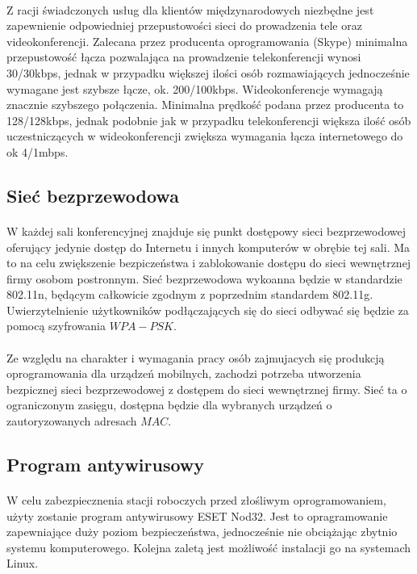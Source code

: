 \paragraph{}
Z racji świadczonych usług dla klientów międzynarodowych niezbędne jest zapewnienie odpowiedniej przepustowości sieci do prowadzenia tele oraz videokonferencji. Zalecana przez producenta oprogramowania (Skype) minimalna przepustowość łącza pozwalająca na prowadzenie telekonferencji wynosi 30/30kbps, jednak w przypadku większej ilości osób rozmawiających jednocześnie wymagane jest szybsze łącze, ok. 200/100kbps. Wideokonferencje wymagają znacznie szybszego połączenia. Minimalna prędkość podana przez producenta to 128/128kbps, jednak podobnie jak w przypadku telekonferencji większa ilość osób uczestniczących w wideokonferencji zwiększa wymagania łącza internetowego do ok 4/1mbps.
\subsection{Sieć bezprzewodowa}
\paragraph{}
W każdej sali konferencyjnej znajduje się punkt dostępowy sieci bezprzewodowej  oferujący jedynie dostęp do Internetu i innych komputerów w obrębie tej sali. Ma to na celu zwiększenie bezpiczeństwa i zablokowanie dostępu do sieci wewnętrznej firmy osobom postronnym. Sieć bezprzewodowa wykoanna będzie w standardzie 802.11n, będącym całkowicie zgodnym z poprzednim standardem 802.11g. Uwierzytelnienie użytkowników podłączających się do sieci odbywać się będzie za pomocą szyfrowania $WPA-PSK$.
\paragraph{}
Ze względu na charakter i wymagania pracy osób zajmujacych się produkcją oprogramowania dla urządzeń mobilnych, zachodzi potrzeba utworzenia bezpicznej sieci bezprzewodowej z dostępem do sieci wewnętrznej firmy. Sieć ta o ograniczonym zasięgu, dostępna będzie dla wybranych urządzeń o zautoryzowanych adresach $MAC$.

\subsection{Program antywirusowy}
\paragraph{}
W celu zabezpiecznenia stacji roboczych przed złośliwym oprogramowaniem, użyty zostanie program antywirusowy ESET Nod32. Jest to opragramowanie zapewniające duży poziom bezpieczeństwa, jednocześnie nie obciążając zbytnio systemu komputerowego. Kolejna zaletą jest możliwość instalacji go na systemach Linux.

